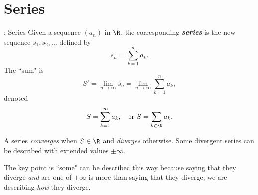\clearpage

\section{Series}
\begin{ndef}{: Series}
	Given a sequence \((a_n)\) in \(\R\), the corresponding \emph{\textbf{series}} is the new sequence \(s_1,s_2,\dots\) defined by 
	\begin{equation*}
		s_n=\sum_{k=1}^{n}a_k.
	\end{equation*}
	The ``sum" is 
	\begin{equation*}
		S'=\lim_{n\to\infty}s_n=\lim_{n\to\infty}\sum_{k=1}^n a_k,
	\end{equation*}
	denoted 
	\begin{equation*}
		S=\sum_{k=1}^{\infty}a_k,\quad\text{or}~S=\sum_{k\in\N}a_k.
	\end{equation*}
\end{ndef} 
A series \emph{converges} when \(S\in\R\) and \emph{diverges} otherwise. Some divergent series can be described with extended values \(\pm\infty\).
\begin{note}
	The key point is ``some" can be described this way because saying that they diverge \emph{and} are one of \(\pm\infty\) is more than saying that they diverge; we are describing \emph{how} they diverge.
\end{note}
